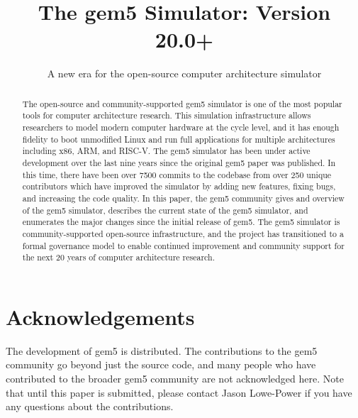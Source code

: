 \documentclass[acmlarge,nonacm,screen=true]{acmart}
\begin{document}
\title{The gem5 Simulator: Version 20.0+}
\subtitle{A new era for the open-source computer architecture simulator}
%


\begin{abstract}
    The open-source and community-supported gem5 simulator is one of the most popular tools for computer architecture research.
    This simulation infrastructure allows researchers to model modern computer hardware at the cycle level, and it has enough fidelity to boot unmodified Linux and run full applications for multiple architectures including x86, ARM, and RISC-V.
    The gem5 simulator has been under active development over the last nine years since the original gem5 paper was published.
    In this time, there have been over 7500 commits to the codebase from over 250 unique contributors which have improved the simulator by adding new features, fixing bugs, and increasing the code quality.
    In this paper, the gem5 community gives and overview of the gem5 simulator, describes the current state of the gem5 simulator, and enumerates the major changes since the initial release of gem5.
    The gem5 simulator is community-supported open-source infrastructure, and the project has transitioned to a formal governance model to enable continued improvement and community support for the next 20 years of computer architecture research.
\end{abstract}

\maketitle
\renewcommand{\shortauthors}{Lowe-Power and the gem5 Community}





\section{Acknowledgements}

The development of gem5 is distributed.
The contributions to the gem5 community go beyond just the source code, and many people who have contributed to the broader gem5 community are not acknowledged here.
Note that until this paper is submitted, please contact Jason Lowe-Power if you have any questions about the contributions.
\end{document}
